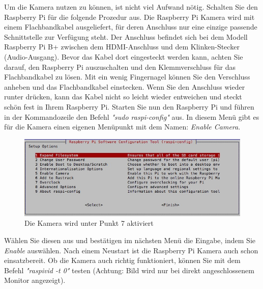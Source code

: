 \documentclass[12pt,a4paper]{scrreprt}
\begin{document}
Um die Kamera nutzen zu können, ist nicht viel Aufwand nötig. Schalten Sie den Raspberry Pi für die folgende Prozedur aus. Die Raspberry Pi Kamera wird mit einem Flachbandkabel ausgeliefert, für deren Anschluss nur eine einzige passende Schnittstelle zur Verfügung steht. Der Anschluss befindet sich bei dem Modell Raspberry Pi B+ zwischen dem HDMI-Anschluss und dem Klinken-Stecker (Audio-Ausgang). Bevor das Kabel dort eingesteckt werden kann, achten Sie darauf, den Raspberry Pi auszuschalten und den Klemmverschluss für das Flachbandkabel zu lösen. Mit ein wenig Fingernagel können Sie den Verschluss anheben und das Flachbandkabel einstecken. Wenn Sie den Anschluss wieder runter drücken, kann das Kabel nicht so leicht wieder entweichen und steckt schön fest in Ihrem Raspberry Pi. Starten Sie nun den Raspberry Pi und führen in der Kommandozeile den Befehl \textit{"sudo raspi-config"} aus. In diesem Menü gibt es für die Kamera einen eigenen Menüpunkt mit dem Namen: \textit{Enable Camera}.\begin{figure}[h] \includegraphics[width=15.8cm]{raspiconfig} \caption{Die Kamera wird unter Punkt 7 aktiviert} \end{figure} Wählen Sie diesen aus und bestätigen im nächsten Menü die Eingabe, indem Sie \textit{Enable} auswählen. Nach einem Neustart ist die Raspberry Pi Kamera auch schon einsatzbereit. Ob die Kamera auch richtig funktioniert, können Sie mit dem Befehl \textit{"raspivid -t 0"} testen (Achtung: Bild wird nur bei direkt angeschlossenem Monitor angezeigt). 
\end{document}
